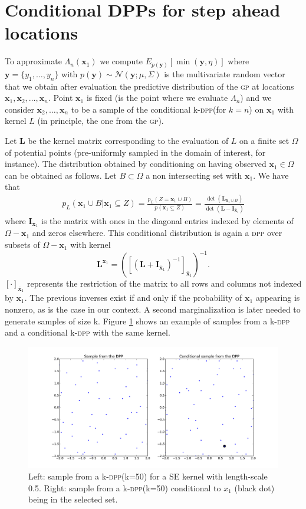 \documentclass{article} %
\newcommand{\bx}{\textbf{x}}
\newcommand{\by}{\textbf{y}}
\newcommand{\bL}{\textbf{L}}
\newcommand{\bI}{\textbf{I}}
\newcommand{\N}{\mathcal{N}}
\newcommand{\acr}[1]{\textsc{#1}\xspace}
\newcommand{\gp}{\acr{gp}}
\newcommand{\dpp}{\acr{dpp}}
\begin{document}
\section{Conditional DPPs for step ahead locations}

To approximate $\Lambda_n(\bx_1)$ we compute  $E_{p(\by)} [\min (\by,\eta)]$ where $\by=\{y_1,\dots,y_n\}$ with $p(\by) \sim \N(\by; \mu, \Sigma)$ is the multivariate random vector that we obtain after evaluation the predictive distribution of the \gp at locations $\bx_1,\bx_2,\dots,\bx_n$. Point $\bx_1$ is fixed (is the point where we evaluate $\Lambda_n$) and we consider $\bx_2,\dots,\bx_n$ to be a sample of the conditional k-\dpp (for $k=n$) on $\bx_1$ with kernel $L$ (in principle, the one from the \gp).
 
Let $\bL$ be the kernel matrix corresponding to the evaluation of $L$ on a finite set $\Omega$ of potential points (pre-uniformly sampled in the domain of interest, for instance).  The distribution obtained by conditioning on having observed $\bx_1 \in \Omega$ can be obtained as follows. Let $B \subset \Omega$ a non intersecting set with $\bx_1$. We have that
\begin{eqnarray}
p_L(\bx_1 \cup B | \bx_1 \subseteq Z ) = \frac{p_L(Z = \bx_1 \cup B ) }{p(\bx_1 \subseteq Z)} = \frac{\det(\bL_{\bx_1 \cup B})}{\det(\bL - \bI_{\bar{\bx}_1} ) }
\end{eqnarray}
where $\bI_{\bar{\bx}_1}$ is the matrix with ones in the diagonal entries indexed by elements of $\Omega - \bx_1$ and zeros elsewhere.  This conditional distribution is again a \dpp over subsets of $\Omega-\bx_1$ \citep{Borodin*Rains*2005} with kernel 
$$\bL^{\bx_1} = \left( [   (\bL + \bI_{\bar{\bx}_1})^{-1}]_{\bar{\bx}_1} \right)^{-1}.$$
$[\cdot ]_{\bar{\bx}_1}$ represents the restriction of the matrix to all rows and columns not indexed by $\bx_1$. The previous inverses exist if and only if the probability of $\bx_1$ appearing is nonzero, as is the case in our context. A second marginalization is later needed to generate samples of size k.  Figure \ref{fig1} shows an example of samples from a k-\dpp and a conditional k-\dpp with the same kernel.
 
\begin{figure}[ht]
    \centering
  \includegraphics[width=.9\textwidth]{conditional_dpp.pdf}
\caption{Left: sample from a k-\dpp (k=50) for a SE kernel with length-scale 0.5. Right: sample from a k-\dpp (k=50) conditional to $x_1$ (black dot) being in the selected set. }
    \label{fig1}
\end{figure}
\end{document}
